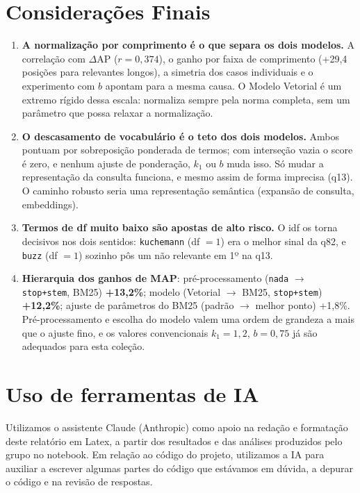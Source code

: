 \documentclass[10pt,a4paper]{article}
\newcommand{\term}[1]{\texttt{#1}}         %
\begin{document}
\section{Considerações Finais}
\begin{enumerate}
  \item \textbf{A normalização por comprimento é o que separa os dois modelos.} A correlação com
  $\Delta$AP ($r=0{,}374$), o ganho por faixa de comprimento (+29,4 posições para relevantes
  longos), a simetria dos casos individuais e o experimento com $b$ apontam para a mesma causa. O
  Modelo Vetorial é um extremo rígido dessa escala: normaliza sempre pela norma completa, sem um
  parâmetro que possa relaxar a normalização.
  \item \textbf{O descasamento de vocabulário é o teto dos dois modelos.} Ambos pontuam por
  sobreposição ponderada de termos; com interseção vazia o score é zero, e nenhum ajuste de
  ponderação, $k_1$ ou $b$ muda isso. Só mudar a representação da consulta funciona, e mesmo assim
  de forma imprecisa (q13). O caminho robusto seria uma representação semântica (expansão de
  consulta, embeddings).
  \item \textbf{Termos de df muito baixo são apostas de alto risco.} O idf os torna decisivos nos
  dois sentidos: \term{kuchemann} (df $=1$) era o melhor sinal da q82, e \term{buzz} (df $=1$)
  sozinho pôs um não relevante em 1º na q13.
  \item \textbf{Hierarquia dos ganhos de MAP}: pré-processamento (\texttt{nada} $\to$
  \texttt{stop+stem}, BM25) \textbf{+13,2\%}; modelo (Vetorial $\to$ BM25, \texttt{stop+stem})
  \textbf{+12,2\%}; ajuste de parâmetros do BM25 (padrão $\to$ melhor ponto) +1,8\%. Pré-processamento
  e escolha do modelo valem uma ordem de grandeza a mais que o ajuste fino, e os valores
  convencionais $k_1=1{,}2$, $b=0{,}75$ já são adequados para esta coleção.
\end{enumerate}

\section{Uso de ferramentas de IA}
Utilizamos o assistente Claude (Anthropic) como apoio na redação e formatação deste relatório em
Latex, a partir dos resultados e das análises produzidos pelo grupo no notebook. Em relação ao código do projeto, utilizamos a IA para auxiliar a escrever algumas partes do código que estávamos em dúvida, a depurar o código e na revisão de respostas.
\end{document}
